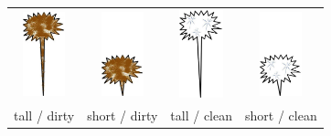 \documentclass[man]{apa2}
\begin{document}
\begin{table} [h]
\begin{center}
\begin{tabular}{ccc|c}
                   \parbox[c]{3em}{\includegraphics[width=0.48in]{figures/appendixPix/shape8_d.png}} & \parbox[c]{3em}{\includegraphics[width=0.48in]{figures/appendixPix/shape8_b.png}} & \parbox[c]{3em}{\includegraphics[width=0.5in]{figures/appendixPix/shape8_a.png}} & \parbox[c]{3em}{\includegraphics[width=0.48in]{figures/appendixPix/shape8_c.png}}\\
       tall / dirty & short / dirty & tall / clean & short / clean \\
               \hline 
               
               
     \end{tabular} 
  \end{center}
 \end{table}

%
%
%
\end{document}
